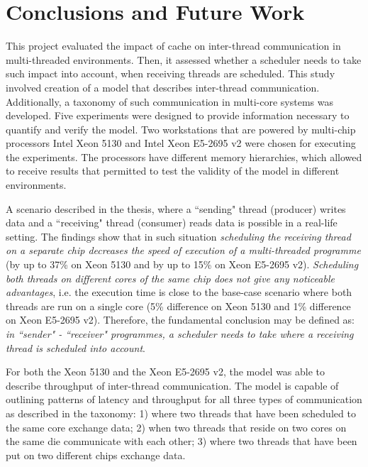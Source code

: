 

\chapter{Conclusions and Future Work} %


\ifpdf
    \graphicspath{{8/figures/PNG/}{8/figures/PDF/}{8/figures/}}
\else
    \graphicspath{{8/figures/EPS/}{8/figures/}}
\fi


This project evaluated the impact of cache on inter-thread communication in multi-threaded environments. Then, it assessed whether a scheduler needs to take such impact into account, when receiving threads are scheduled. This study involved creation of a model that describes inter-thread communication. Additionally, a taxonomy of such communication in multi-core systems was developed. Five experiments were designed to provide information necessary to quantify and verify the model. Two workstations that are powered by multi-chip processors Intel Xeon 5130 and Intel Xeon E5-2695 v2 were chosen for executing the experiments. The processors have different memory hierarchies, which allowed to receive results that permitted to test the validity of the model in different environments.

A scenario described in the thesis, where a ``sending" thread (producer) writes data and a ``receiving" thread (consumer) reads data is possible in a real-life setting. The findings show that in such situation \textit{scheduling the receiving thread on a separate chip decreases the speed of execution of a multi-threaded programme} (by up to 37\% on Xeon 5130 and by up to 15\% on Xeon E5-2695 v2). \textit{Scheduling both threads on different cores of the same chip does not give any noticeable advantages}, i.e. the execution time is close to the base-case scenario where both threads are run on a single core (5\% difference on Xeon 5130 and 1\% difference on Xeon E5-2695 v2). Therefore, the fundamental conclusion may be defined as: \textit{in ``sender" - ``receiver" programmes, a scheduler needs to take where a receiving thread is scheduled into account}.

For both the Xeon 5130 and the Xeon E5-2695 v2, the model was able to describe throughput of inter-thread communication. The model is capable of outlining patterns of latency and throughput for all three types of communication as described in the taxonomy: 1) where two threads that have been scheduled to the same core exchange data; 2) when two threads that reside on two cores on the same die communicate with each other; 3) where two threads that have been put on two different chips exchange data.

